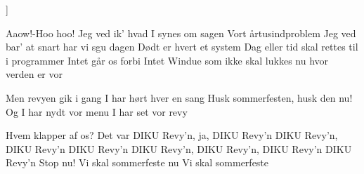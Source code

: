 \documentclass[danish]{article}
\begin{document}
]
\begin{song}

         Aaow!-Hoo hoo!
                        Jeg ved ik' hvad I synes om sagen
                        Vort årtusindproblem
                        Jeg ved bar' at snart har vi sgu dagen
                        Dødt er hvert et system                         
                        Dag eller tid skal rettes til i programmer      
                        Intet går os forbi                              
                        Intet Windue som ikke skal lukkes               
                        nu hvor verden er vor                          

             Men revyen gik i gang                           
                        I har hørt hver en sang                         
         Husk sommerfesten, husk den nu!                 
             Og I har nydt vor menu                          
                        I har set vor revy                              

         Hvem klapper af os?                             
                        Det var DIKU Revy'n, ja,
                        DIKU Revy'n
             DIKU Revy'n, DIKU Revy'n
         DIKU Revy'n
             DIKU Revy'n, DIKU Revy'n, DIKU Revy'n
         DIKU Revy'n
                        Stop nu!
                        Vi skal sommerfeste nu                          
             Vi skal sommerfeste                             


\end{song}
\end{document}
